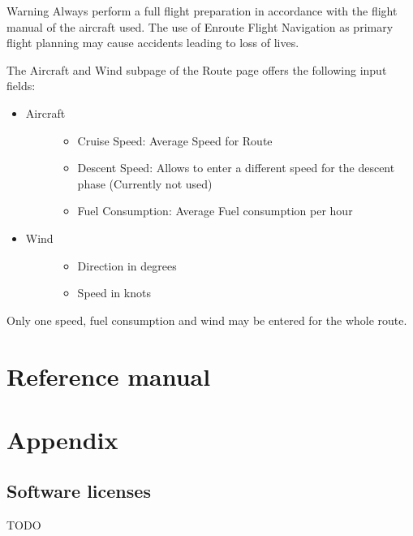 \documentclass[letterpaper,10pt,english]{sphinxmanual}
\begin{document}
Warning
Always perform a full flight preparation in accordance with the flight manual of the aircraft used. The use of Enroute Flight Navigation as primary flight planning may cause accidents leading to loss of lives.

The Aircraft and Wind sub\sphinxhyphen{}page of the Route page offers the following input fields:
\begin{itemize}
\item {} \begin{description}
\item[{Aircraft}] \leavevmode\begin{itemize}
\item {} 
Cruise Speed: Average Speed for Route

\item {} 
Descent Speed: Allows to enter a different speed for the descent phase (Currently not used)

\item {} 
Fuel Consumption: Average Fuel consumption per hour

\end{itemize}

\end{description}

\item {} \begin{description}
\item[{Wind}] \leavevmode\begin{itemize}
\item {} 
Direction in degrees

\item {} 
Speed in knots

\end{itemize}

\end{description}

\end{itemize}

Only one speed, fuel consumption and wind may be entered for the whole route.

\part{Reference manual}

\part{Appendix}


\chapter{Software licenses}
\label{\detokenize{03-appendix/licenses:software-licenses}}\label{\detokenize{03-appendix/licenses::doc}}
TODO



\renewcommand{\indexname}{Index}
\printindex
\end{document}
